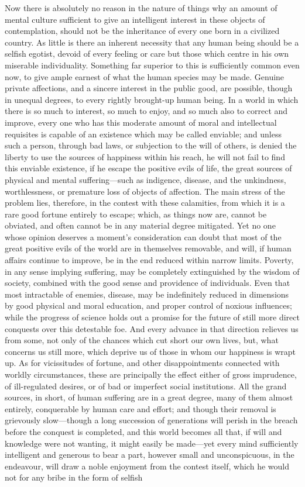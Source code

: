 \documentclass[12pt]{report}
\begin{document}
Now there is absolutely no reason in the nature of things why an amount of mental culture sufficient to give an intelligent interest in these objects of contemplation, should not be the inheritance of every one born in a civilized country. As little is there an inherent necessity that any human being should be a selfish egotist, devoid of every feeling or care but those which centre in his own miserable individuality. Something far superior to this is sufficiently common even now, to give ample earnest of what the human species may be made. Genuine private affections, and a sincere interest in the public good, are possible, though in unequal degrees, to every rightly brought-up human being. In a world in which there is so much to interest, so much to enjoy, and so much also to correct and improve, every one who has this moderate amount of moral and intellectual requisites is capable of an existence which may be called enviable; and unless such a person, through bad laws, or subjection to the will of others, is denied the liberty to use the sources of happiness within his reach, he will not fail to find this enviable existence, if he escape the positive evils of life, the great sources of physical and mental suffering—such as indigence, disease, and the unkindness, worthlessness, or premature loss of objects of affection. The main stress of the problem lies, therefore, in the contest with these calamities, from which it is a rare good fortune entirely to escape; which, as things now are, cannot be obviated, and often cannot be in any material degree mitigated. Yet no one whose opinion deserves a moment's consideration can doubt that most of the great positive evils of the world are in themselves removable, and will, if human affairs continue to improve, be in the end reduced within narrow limits. Poverty, in any sense implying suffering, may be completely extinguished by the wisdom of society, combined with the good sense and providence of individuals. Even that most intractable of enemies, disease, may be indefinitely reduced in dimensions by good physical and moral education, and proper control of noxious influences; while the progress of science holds out a promise for the future of still more direct conquests over this detestable foe. And every advance in that direction relieves us from some, not only of the chances which cut short our own lives, but, what concerns us still more, which deprive us of those in whom our happiness is wrapt up. As for vicissitudes of fortune, and other disappointments connected with worldly circumstances, these are principally the effect either of gross imprudence, of ill-regulated desires, or of bad or imperfect social institutions. All the grand sources, in short, of human suffering are in a great degree, many of them almost entirely, conquerable by human care and effort; and though their removal is grievously slow—though a long succession of generations will perish in the breach before the conquest is completed, and this world becomes all that, if will and knowledge were not wanting, it might easily be made—yet every mind sufficiently intelligent and generous to bear a part, however small and unconspicuous, in the endeavour, will draw a noble enjoyment from the contest itself, which he would not for any bribe in the form of selfish 
\end{document}
